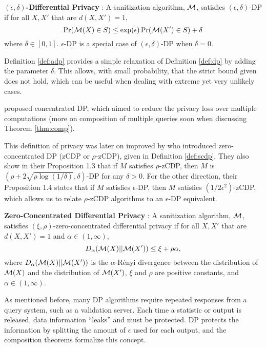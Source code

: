 \begin{defn}\label{def:adp} \textbf{$(\epsilon, \delta)$-Differential Privacy} \citep{dwork2006our}:
A sanitization algorithm, $\mathcal{M}$, satisfies $(\epsilon, \delta)$-DP if for all $X, X'$ that are $d(X,X')=1$,
    \begin{equation}\label{eqn:adp}
        \Pr(\mathcal{M}( X) \in S)\le \exp(\epsilon) \Pr(\mathcal{M}( X')\in S) + \delta
    \end{equation}
    where $\delta\in [0,1]$. $\epsilon$-DP is a special case of $(\epsilon, \delta)$-DP when $\delta=0$.
\end{defn}
\vspace{-8pt}
Definition \ref{def:adp} provides a simple relaxation of Definition \ref{def:dp} by adding the parameter $\delta$. This allows, with small probability, that the strict bound given does not hold, which can be useful when dealing with extreme yet very unlikely cases.

\cite{dwork2016concentrated} proposed concentrated DP, which aimed to reduce the privacy loss over multiple computations (more on composition of multiple queries soon when discussing Theorem \ref{thm:comp}).

This definition of privacy was later on improved by
\cite{bun2016concentrated} who introduced zero-concentrated DP (zCDP or $\rho$-zCDP), given in Definition \ref{def:scdp}. 
They also show in their Proposition 1.3 that if $M$ satisfies $\rho$-zCDP, then $M$ is $(\rho+2\sqrt{\rho\log(1/\delta)},\delta)$-DP for any $\delta>0$. For the other direction, their Proposition 1.4 states that if $M$ satisfies $\epsilon$-DP, then $M$ satisfies $(1/2\epsilon^2)$-zCDP, which allows us to relate $\rho$-zCDP algorithms to an $\epsilon$-DP equivalent.

\begin{defn}\label{def:scdp} \textbf{Zero-Concentrated Differential Privacy} \citep{bun2016concentrated}:
A sanitization algorithm, $\mathcal{M}$, satisfies $(\xi, \rho)$-zero-concentrated differential privacy if for all $X, X'$ that are $d(X,X')=1$ and $\alpha\in (1, \infty)$,
    \begin{equation}
        D_\alpha(\mathcal{M}(X)||\mathcal{M}(X'))\leq\xi+\rho\alpha,
    \end{equation}
    where $D_\alpha(\mathcal{M}(X)||\mathcal{M}(X'))$ is the $\alpha$-R\'enyi divergence
    between the distribution of $\mathcal{M}(X)$ and the distribution of $\mathcal{M}(X')$, $\xi$ and $\rho$ are positive constants, and $\alpha \in (1,\infty)$.
\end{defn}
\vspace{-8pt}
As mentioned before, many DP algorithms require repeated responses from a query system, such as a validation server. Each time a statistic or output is released, data information ``leaks'' and must be protected. DP protects the information by splitting the amount of $\epsilon$ used for each output, and the composition theorems formalize this concept.

